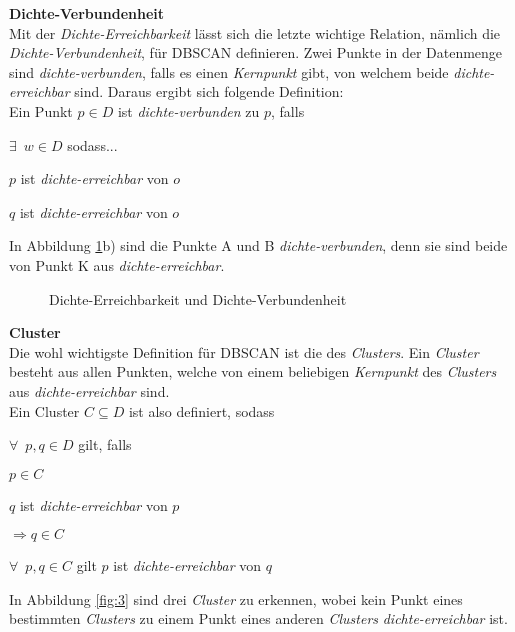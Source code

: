 \documentclass{lni}
\newcommand{\SubItem}[1]{
    {\setlength\itemindent{15pt} \item[-] #1}
}
\begin{document}

\textbf{Dichte-Verbundenheit}\\
Mit der \textit{Dichte-Erreichbarkeit} lässt sich die letzte wichtige Relation, nämlich die \textit{Dichte-Verbundenheit}, für DBSCAN definieren. Zwei Punkte in der Datenmenge sind \textit{dichte-verbunden}, falls es einen \textit{Kernpunkt} gibt, von welchem beide \textit{dichte-erreichbar} sind. Daraus ergibt sich folgende Definition:\\
Ein Punkt $ p \in D $ ist \textit{dichte-verbunden} zu $p$, falls
\begin{itemize}
    \item $\exists\enspace w \in D$ sodass...
        \SubItem{ $p$ ist \textit{dichte-erreichbar} von $o$}
        \SubItem{ $q$ ist \textit{dichte-erreichbar} von $o$}
\end{itemize}
In Abbildung \ref{fig:2}b) sind die Punkte A und B \textit{dichte-verbunden}, denn sie sind beide von Punkt K aus \textit{dichte-erreichbar}.


\begin{figure}[hb]
    \centering
    \subfloat[]{{}}%
    \qquad
    \subfloat[]{{}}
    \caption{Dichte-Erreichbarkeit und Dichte-Verbundenheit}%
    \label{fig:2}%
\end{figure}


\textbf{Cluster}\\
Die wohl wichtigste Definition für DBSCAN ist die des \textit{Clusters}. Ein \textit{Cluster} besteht aus allen Punkten, welche von einem beliebigen \textit{Kernpunkt} des \textit{Clusters} aus \textit{dichte-erreichbar} sind.\\
Ein Cluster $ C \subseteq D $ ist also definiert, sodass
\begin{itemize}
    \item $\forall\enspace p,q \in D$ gilt, falls
        \SubItem{$p \in C$}
        \SubItem{$q$ ist \textit{dichte-erreichbar} von $p$}
    $\Rightarrow q \in C$
    \item $\forall\enspace p,q \in C$ gilt $p$ ist \textit{dichte-erreichbar} von $q$
\end{itemize}
In Abbildung \ref{fig:3} sind drei \textit{Cluster} zu erkennen, wobei kein Punkt eines bestimmten \textit{Clusters} zu einem Punkt eines anderen \textit{Clusters} \textit{dichte-erreichbar} ist.\\
\end{document}
